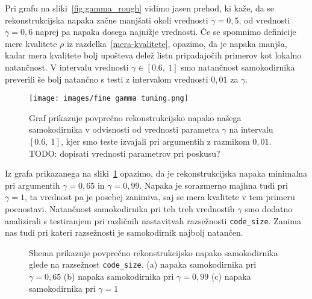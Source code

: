 \documentclass[12pt,a4paper,twoside]{article}
\theoremstyle{definition} %
\theoremstyle{plain} %
\numberwithin{equation}{section}  %
\begin{document}
Pri grafu na sliki~\ref{fig:gamma_rough} vidimo jasen prehod, ki kaže, da se rekonstrukcijska napaka začne manjšati okoli vrednosti $\gamma=0,5$, 
od vrednosti $\gamma=0,6$ naprej pa napaka dosega najnižje vrednosti.
Če se spomnimo definicije mere kvalitete $\rho$ iz razdelka~\ref{mera-kvalitete}, opazimo, da je napaka manjša, 
kadar mera kvalitete bolj upošteva delež listu pripadajočih primerov kot lokalno natančnost.
V intervalu vrednosti $\gamma \in [0.6,\ 1]$ smo natančnost samokodirnika preverili še bolj natančno s testi z intervalom vrednosti $0,01$ za $\gamma$.

\begin{figure}[h]
	\centering
	\texttt{[image: images/fine gamma tuning.png]}
	\caption[Podrobnejši graf napake glede na $\gamma$.]{Graf prikazuje povprečno rekonstrukcijsko napako našega 
	samokodirnika v odvisnosti od vrednosti parametra $\gamma$ na intervalu $[0.6,\ 1]$, kjer smo teste izvajali pri argumentih z razmikom $0,01$. 
	TODO: dopisati vrednosti parametrov pri poskusu?}
	\label{fig:gamma_fine}
\end{figure}

Iz grafa prikazanega na sliki~\ref{fig:gamma_fine} opazimo, da je rekonstrukcijska napaka minimalna pri argumentih $\gamma=0,65$ in $\gamma=0,99$. %
Napaka je sorazmerno majhna tudi pri $\gamma=1$, ta vrednost pa je posebej zanimiva, saj se mera kvalitete v tem primeru poenostavi.
Natančnost samokodirnika pri teh treh vrednostih $\gamma$ smo dodatno analizirali s testiranjem pri različnih nastavitvah razsežnosti \texttt{code\_size}.
Zanima nas tudi pri kateri razsežnosti je samokodirnik najbolj natančen.

\begin{figure}[h]
	\centering
	\caption[Tri grafi napake glede na \texttt{code\_size}]{Shema prikazuje povprečno rekonstrukcijsko napako samokodirnika glede na razsežnost \texttt{code\_size}.
		(a) napaka samokodirnika pri $\gamma = 0,65$ 
		(b) napaka samokodirnika pri $\gamma = 0,99$ 
		(c) napaka samokodirnika pri $\gamma = 1$}
	\label{fig:triple_code_size}
\end{figure}
\end{document}
